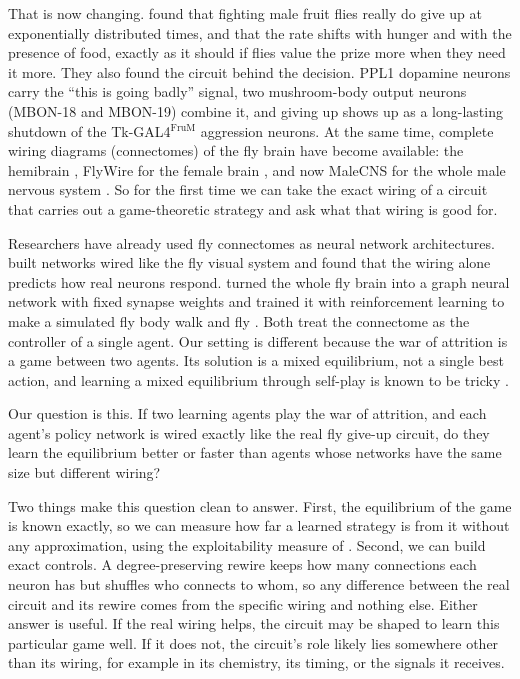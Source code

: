 \documentclass{article}
\begin{document}
That is now changing. \citet{ventimiglia2026} found that fighting male fruit flies really do give up at exponentially distributed times, and that the rate shifts with hunger and with the presence of food, exactly as it should if flies value the prize more when they need it more. They also found the circuit behind the decision. PPL1 dopamine neurons carry the ``this is going badly'' signal, two mushroom-body output neurons (MBON-18 and MBON-19) combine it, and giving up shows up as a long-lasting shutdown of the Tk-GAL4$^{\mathrm{FruM}}$ aggression neurons. At the same time, complete wiring diagrams (connectomes) of the fly brain have become available: the hemibrain \citep{scheffer2020}, FlyWire for the female brain \citep{dorkenwald2024}, and now MaleCNS for the whole male nervous system \citep{berg2026}. So for the first time we can take the exact wiring of a circuit that carries out a game-theoretic strategy and ask what that wiring is good for.

Researchers have already used fly connectomes as neural network architectures. \citet{lappalainen2024} built networks wired like the fly visual system and found that the wiring alone predicts how real neurons respond. \citet{jin2026} turned the whole fly brain into a graph neural network with fixed synapse weights and trained it with reinforcement learning to make a simulated fly body walk and fly \citep{vaxenburg2025}. Both treat the connectome as the controller of a single agent. Our setting is different because the war of attrition is a game between two agents. Its solution is a mixed equilibrium, not a single best action, and learning a mixed equilibrium through self-play is known to be tricky \citep{fudenberg1998, hofbauer2009}.

Our question is this. If two learning agents play the war of attrition, and each agent's policy network is wired exactly like the real fly give-up circuit, do they learn the equilibrium better or faster than agents whose networks have the same size but different wiring?

Two things make this question clean to answer. First, the equilibrium of the game is known exactly, so we can measure how far a learned strategy is from it without any approximation, using the exploitability measure of \citet{bichler2021}. Second, we can build exact controls. A degree-preserving rewire \citep{maslov2002} keeps how many connections each neuron has but shuffles who connects to whom, so any difference between the real circuit and its rewire comes from the specific wiring and nothing else. Either answer is useful. If the real wiring helps, the circuit may be shaped to learn this particular game well. If it does not, the circuit's role likely lies somewhere other than its wiring, for example in its chemistry, its timing, or the signals it receives.
\end{document}
